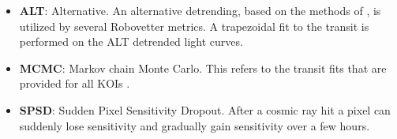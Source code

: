 \begin{itemize}
\item[] \textbf{ALT}: Alternative. An alternative detrending, based on the methods of \citet{Garcia2010}, is utilized by several Robovetter metrics. A trapezoidal fit to the transit is performed on the ALT detrended light curves.
\item[] \textbf{MCMC}: Markov chain Monte Carlo. This refers to the transit fits that are provided for all KOIs \citep{Hoffman2017}.
\item[] \textbf{SPSD}: Sudden Pixel Sensitivity Dropout.  After a cosmic ray hit a pixel can suddenly lose sensitivity and gradually gain sensitivity over a few hours.

\end{itemize}
